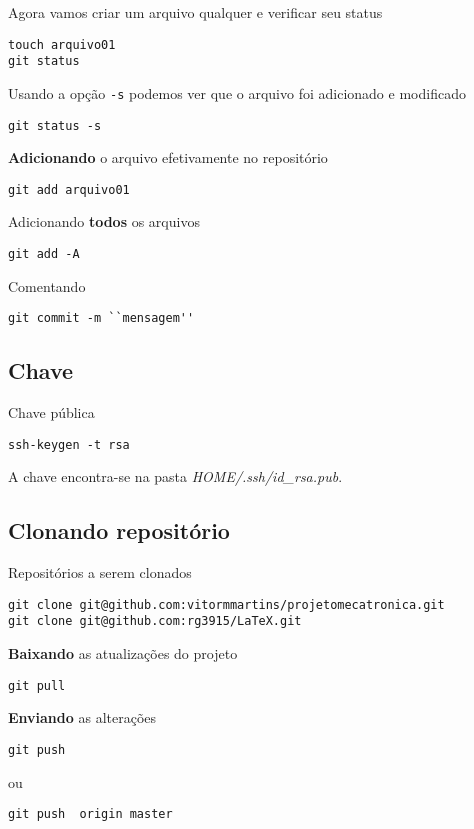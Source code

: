 \documentclass[a4paper]{article}
\begin{document}
Agora vamos criar um arquivo qualquer e verificar seu status
\begin{lstlisting}
touch arquivo01
git status
\end{lstlisting}

Usando a opção \verb|-s| podemos ver que o arquivo foi adicionado e modificado
\begin{lstlisting}
git status -s
\end{lstlisting}

\textbf{Adicionando} o arquivo efetivamente no repositório
\begin{lstlisting}
git add arquivo01
\end{lstlisting}

Adicionando \textbf{todos} os arquivos
\begin{lstlisting}
git add -A
\end{lstlisting}

Comentando
\begin{lstlisting}
git commit -m ``mensagem''
\end{lstlisting}

\subsection*{Chave}

Chave pública
\begin{lstlisting}
ssh-keygen -t rsa
\end{lstlisting}

A chave encontra-se na pasta \emph{HOME/.ssh/id\_rsa.pub}.

\subsection*{Clonando repositório}

Repositórios a serem clonados
\begin{lstlisting}
git clone git@github.com:vitormmartins/projetomecatronica.git
git clone git@github.com:rg3915/LaTeX.git
\end{lstlisting}

\textbf{Baixando} as atualizações do projeto
\begin{lstlisting}
git pull
\end{lstlisting}

\textbf{Enviando} as alterações
\begin{lstlisting}
git push
\end{lstlisting}

ou
\begin{lstlisting}
git push  origin master
\end{lstlisting}
\end{document}
